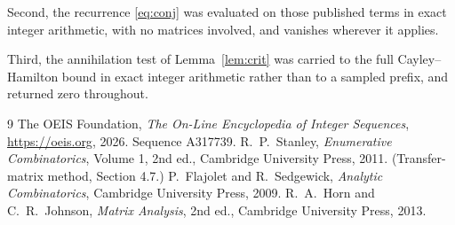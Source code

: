 \documentclass[11pt,a4paper]{article}
\theoremstyle{plain}
\theoremstyle{definition}
\begin{document}
Second, the recurrence \eqref{eq:conj} was evaluated on those published terms in exact
integer arithmetic, with no matrices involved, and vanishes wherever it applies.

Third, the annihilation test of Lemma~\ref{lem:crit} was carried to the full
Cayley--Hamilton bound in exact integer arithmetic rather than to a sampled prefix, and
returned zero throughout.

\begin{thebibliography}{9}
 The OEIS Foundation, \emph{The On-Line Encyclopedia of Integer
Sequences}, \url{https://oeis.org}, 2026. Sequence A317739.
 R.~P.~Stanley, \emph{Enumerative Combinatorics}, Volume 1, 2nd ed.,
Cambridge University Press, 2011. (Transfer-matrix method, Section 4.7.)
 P.~Flajolet and R.~Sedgewick, \emph{Analytic Combinatorics}, Cambridge
University Press, 2009.
 R.~A.~Horn and C.~R.~Johnson, \emph{Matrix Analysis}, 2nd ed., Cambridge
University Press, 2013.
\end{thebibliography}
\end{document}
